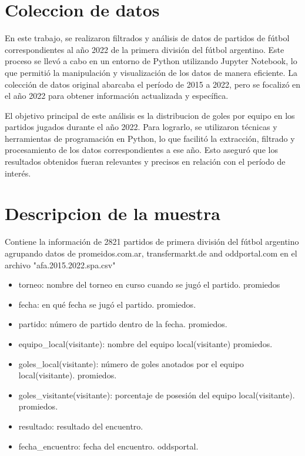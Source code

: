 
\section{Coleccion de datos}

En este trabajo, se realizaron filtrados y análisis de datos de partidos de fútbol correspondientes al año 2022 de la primera división del fútbol argentino. Este proceso se llevó a cabo en un entorno de Python utilizando Jupyter Notebook, lo que permitió la manipulación y visualización de los datos de manera eficiente. La colección de datos original abarcaba el período de 2015 a 2022, pero se focalizó en el año 2022 para obtener información actualizada y específica.

El objetivo principal de este análisis es la distribucion de goles por equipo en los partidos jugados durante el año 2022. Para lograrlo, se utilizaron técnicas y herramientas de programación en Python, lo que facilitó la extracción, filtrado y procesamiento de los datos correspondientes a ese año. Esto aseguró que los resultados obtenidos fueran relevantes y precisos en relación con el período de interés.




\section{Descripcion de la muestra}

Contiene la información de 2821 partidos de primera división del fútbol argentino agrupando datos de promeidos.com.ar, transfermarkt.de and oddportal.com en el archivo "afa.2015.2022.spa.csv"
\begin{itemize}
    \item torneo: nombre del torneo en curso cuando se jugó el partido. promiedos
    \item fecha: en qué fecha se jugó el partido. promiedos.
    \item partido: número de partido dentro de la fecha. promiedos.
    \item equipo\_local(visitante): nombre del equipo local(visitante) promiedos.
    \item goles\_local(visitante): número de goles anotados por el equipo local(visitante). promiedos.
    \item goles\_visitante(visitante): porcentaje de posesión del equipo local(visitante). promiedos.
    \item resultado: resultado del encuentro.
    \item fecha\_encuentro: fecha del encuentro. oddsportal.
\end{itemize}


